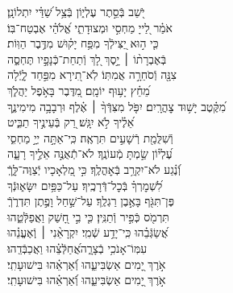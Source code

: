 \documentclass[twoside, openany, parskip=half, 11pt]{book}
\begin{document}
\begin{narrow}
יֹ֭שֵׁב בְּֿסֵ֣תֶר עֶלְי֑וֹן
 \hfill בְּֿצֵ֥ל שַׁ֝דַּ֗י יִתְלוֹנָֽן׃ \\
 אֹמַ֗ר לַ֭ייָ מַחְסִ֣י וּמְצוּדָתִ֑י \hfill אֱ֝לֹהַ֗י אֶבְטַח־בּֽוֹ׃ \\
 כִּ֤י ה֣וּא יַ֭צִּילְֿךָ מִפַּ֥ח יָק֗וּשׁ \hfill מִדֶּ֥בֶר הַוּֽוֹת׃ \\
 בְּֿאֶבְרָת֨וֹ ׀ יָ֣סֶךְ לָ֭ךְ \hfill וְֿתַחַת־כְּֿנָפָ֣יו תֶּחְסֶ֑ה\\ צִנָּ֖ה וְֿסֹחֵרָ֣ה אֲמִתּֽוֹ׃ \hfill
 לֹֽא־תִ֭ירָא מִפַּ֣חַד לָ֑יְֿלָה\\ מֵ֝חֵ֗ץ יָע֥וּף יוֹמָֽם׃ \hfill
 מִ֭דֶּבֶר בָּאֹ֣פֶל יַהֲלֹ֑ךְ \\ מִ֝קֶּ֗טֶב יָשׁ֥וּד צׇהֳרָֽיִם׃ \hfill
 יִפֹּ֤ל מִצִּדְּֿךָ֨ ׀ אֶ֗לֶף וּרְבָבָ֥ה מִימִינֶ֑ךָ\\ אֵ֝לֶ֗יךָ לֹ֣א יִגָּֽשׁ׃ \hfill
 רַ֭ק בְּֿעֵינֶ֣יךָ תַבִּ֑יט\\ וְֿשִׁלֻּמַ֖ת רְֿשָׁעִ֣ים תִּרְאֶֽה׃ \hfill
 כִּֽי־אַתָּ֣ה יְיָ֣ מַחְסִ֑י\\ עֶ֝לְי֗וֹן שַׂ֣מְתָּ מְֿעוֹנֶֽךָ׃ \hfill
 לֹא־תְֿֿאֻנֶּ֣ה אֵלֶ֣יךָ רָעָ֑ה\\ וְֿ֝נֶ֗גַע לֹא־יִקְרַ֥ב בְּֿאׇהֳלֶֽךָ׃ \hfill
 כִּ֣י מַ֭לְאָכָיו יְֿצַוֶּה־לָּ֑ךְֿ\\ לִ֝שְׁמׇרְךָ֗ בְּֿכׇל־דְּֿרָכֶֽיךָ׃ \hfill
 עַל־כַּפַּ֥יִם יִשָּׂא֑וּנְֿךָ\\ פֶּן־תִּגֹּ֖ף בָּאֶ֣בֶן רַגְלֶֽךָ׃ \hfill
 עַל־שַׁ֣חַל וָפֶ֣תֶן תִּדְרֹ֑ךְֿ\\ תִּרְמֹ֖ס כְּֿפִ֣יר וְֿתַנִּֽין׃ \hfill
 כִּ֤י בִ֣י חָ֭שַׁק וַאֲפַלְּֿטֵ֑הוּ\\ אֲ֝שַׂגְּֿבֵ֗הוּ כִּֽי־יָדַ֥ע שְֿׁמִֽי׃ \hfill
 יִקְרָאֵ֨נִי ׀ וְֽֿאֶעֱנֵ֗הוּ\\ עִמּֽוֹ־אָנֹכִ֥י בְֿצָרָ֑ה\hfill אֲ֝חַלְּֿצֵ֗הוּ וַאֲכַבְּֿדֵֽהוּ׃ \\
 אֹ֣רֶךְ יָ֭מִים אַשְׂבִּיעֵ֑הוּ \hfill וְֿ֝אַרְאֵ֗הוּ בִּישׁוּעָתִֽי׃ \\
\scriptsize{אֹ֣רֶךְ יָ֭מִים אַשְׂבִּיעֵ֑הוּ \hfill וְֿ֝אַרְאֵ֗הוּ בִּישׁוּעָתִֽי׃ \\}
\normalsize{}


\end{narrow}
\end{document}
